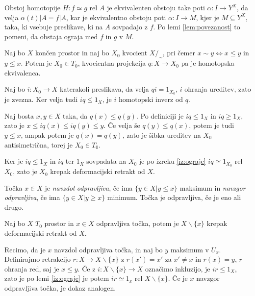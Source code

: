 \begin{dokaz}
    Obstoj homotopije $H:f\simeq g$ rel $A$ je ekvivalenten obstoju take poti $\alpha: I \rightarrow Y^X$, da velja $\alpha(t)|A=f|A$, kar je ekvivalentno obstoju poti 
    $\alpha: I \rightarrow M$, kjer je $M\subseteq Y^X$, taka, ki vsebuje preslikave, ki na $A$ sovpadajo z $f$. Po lemi \ref{lem:povezanost} to pomeni, da obstaja ograja 
    med $f$ in $g$ v $M$.
\end{dokaz}

\begin{izrek}
    Naj bo $X$ končen prostor in naj bo $X_0$ kvocient $X/_\sim$, pri čemer $x\sim y \Leftrightarrow x\le y$ in $y\le x$. Potem je $X_0\in T_0$, kvocientna projekcija $q:X\rightarrow X_0$ pa je homotopska ekvivalenca.
\end{izrek}

\begin{dokaz}
    Naj bo $i:X_0\rightarrow X$ katerakoli preslikava, da velja $qi=1_{X_0}$, $i$ ohranja ureditev, zato je zvezna. Ker velja tudi $iq \leq 1_X$, je $i$ homotopski inverz od $q$.

    Naj bosta $x,y\in X$ taka, da $q(x)\leq q(y)$. Po definiciji je $iq \leq 1_X$ in $iq \geq 1_X$, zato je $x \leq iq(x) \leq iq(y) \leq y$. Če velja še $q(y)\leq q(x)$, potem je tudi $y\leq x$, ampak potem je $q(x)=q(y)$, zato je šibka ureditev na $X_0$ antisimetrična, torej je $X_0\in T_0$.
\end{dokaz}


    Ker je $iq\leq 1_X$ in $iq$ ter $1_X$ sovpadata na $X_0$ je po izreku \ref{iz:ograje} $iq \simeq 1_{X_0}$ rel $X_0$, zato je $X_0$ krepak deformacijski retrakt od $X$.


\begin{definicija}
    Točka $x \in X$ je \textit{navzdol odpravljiva}, če ima $\{y\in X | y \le x\}$ maksimum in \textit{navzgor odpravljiva}, če ima $\{y\in X | y \ge x\}$ minimum. 
    Točka je odpravljiva, če je eno ali drugo.
\end{definicija}

\begin{izrek}
Naj bo $X$ $T_0$ prostor in $x\in X$ odpravljiva točka, potem je $X\backslash \{x\}$ krepak deformacijski retrakt od $X$.
\end{izrek}

\begin{dokaz}
Recimo, da je $x$ navzdol odpravljiva točka, in naj bo $y$ 
maksimum v $U_x$. Definirajmo retrakcijo $r:X\rightarrow 
X\backslash \{x\}$ z $r(x')=x'$ za $x'\neq x$ in $r(x)=y$, 
$r$ ohranja red, saj je $x\leq y$. Če z $i:X\backslash\{x\} 
\rightarrow X$ označimo inkluzijo, je $ir\leq 1_X$, zato je 
po lemi \ref{iz:ograje} je potem $ir \simeq 1_x$ rel 
$X\backslash\{x\}$. Če je $x$ navzgor odpravljiva točka, je 
dokaz analogen.
\end{dokaz}

